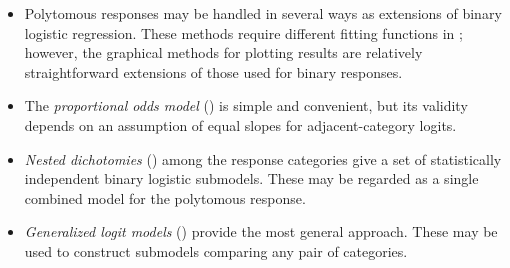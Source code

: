 \begin{itemize}
\item Polytomous responses may be handled in several ways as extensions of binary
logistic regression.  These methods require different fitting functions in \R;
however, the graphical methods for plotting results are relatively straightforward
extensions of those used for binary responses.
 \item The \emph{proportional odds model} () is simple and convenient, but its validity
depends
on an assumption of equal slopes for adjacent-category logits.
 \item \emph{Nested dichotomies} () among the response categories give a set of statistically independent binary logistic submodels.
These may be regarded as a single combined model for the polytomous response.
 \item \emph{Generalized logit models} () provide the most general approach. These
 may be used to construct submodels comparing any pair of categories.

\end{itemize}

